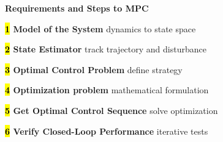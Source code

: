 
\begin{sstTitleBox}[BrickRed]{\center\textbf{\large
			Requirements and Steps to MPC
		}}
	\begin{centering}
		\begin{sstOnlyFrame}[BrickRed]
			\small
			\textbf{\textcolor{hltext}{\hl{ 1 }}}
			\textbf{Model of the System}
			dynamics to state space

			\textbf{\textcolor{hltext}{\hl{ 2 }}}
			\textbf{State Estimator}
			track trajectory and disturbance

			\textbf{\textcolor{hltext}{\hl{ 3 }}}
			\textbf{Optimal Control Problem}
			define strategy

			\textbf{\textcolor{hltext}{\hl{ 4 }}}
			\textbf{Optimization problem}
			mathematical formulation

			\textbf{\textcolor{hltext}{\hl{ 5 }}}
			\textbf{Get Optimal Control Sequence}
			solve optimization

			\textbf{\textcolor{hltext}{\hl{ 6 }}}
			\textbf{Verify Closed-Loop Performance}
			iterative tests
		\end{sstOnlyFrame}
	\end{centering}
\end{sstTitleBox}
